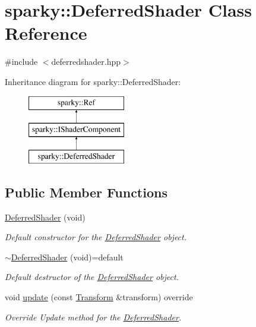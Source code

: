 \hypertarget{classsparky_1_1_deferred_shader}{}\section{sparky\+:\+:Deferred\+Shader Class Reference}
\label{classsparky_1_1_deferred_shader}


{\ttfamily \#include $<$deferredshader.\+hpp$>$}

Inheritance diagram for sparky\+:\+:Deferred\+Shader\+:\begin{figure}[H]
\begin{center}
\leavevmode
\includegraphics[height=3.000000cm]{classsparky_1_1_deferred_shader}
\end{center}
\end{figure}
\subsection*{Public Member Functions}
\begin{DoxyCompactItemize}
\item 
\hyperlink{classsparky_1_1_deferred_shader_a1ac9782cd2b233099b7bff4f5b238c6c}{Deferred\+Shader} (void)
\begin{DoxyCompactList}\small\item\em Default constructor for the \hyperlink{classsparky_1_1_deferred_shader}{Deferred\+Shader} object. \end{DoxyCompactList}\item 
\hyperlink{classsparky_1_1_deferred_shader_a3048e153ef920d909076d4f41079c94f}{$\sim$\+Deferred\+Shader} (void)=default\hypertarget{classsparky_1_1_deferred_shader_a3048e153ef920d909076d4f41079c94f}{}\label{classsparky_1_1_deferred_shader_a3048e153ef920d909076d4f41079c94f}

\begin{DoxyCompactList}\small\item\em Default destructor of the \hyperlink{classsparky_1_1_deferred_shader}{Deferred\+Shader} object. \end{DoxyCompactList}\item 
void \hyperlink{classsparky_1_1_deferred_shader_a664f2316993fab2147c0a34513a5039a}{update} (const \hyperlink{classsparky_1_1_transform}{Transform} \&transform) override
\begin{DoxyCompactList}\small\item\em Override Update method for the \hyperlink{classsparky_1_1_deferred_shader}{Deferred\+Shader}. \end{DoxyCompactList}\end{DoxyCompactItemize}
